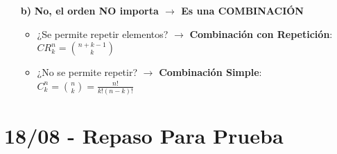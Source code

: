 \documentclass[12pt, letterpaper]{article}
\begin{document}
\begin{enumerate}[label=\bfseries, wide]
\begin{itemize}
		      \item[\bfseries b)] \textbf{No, el orden NO importa $\rightarrow$ Es una COMBINACIÓN}
		            \begin{itemize}
			            \item ¿Se permite repetir elementos? $\rightarrow$ \textbf{Combinación con Repetición}: $CR_k^n = \binom{n+k-1}{k}$
			            \item ¿No se permite repetir? $\rightarrow$ \textbf{Combinación Simple}: $C_k^n = \binom{n}{k} = \frac{n!}{k!(n-k)!}$
		            \end{itemize}
	      \end{itemize}
\end{enumerate}

\newpage


\section{18/08 - Repaso Para Prueba}
\end{document}
